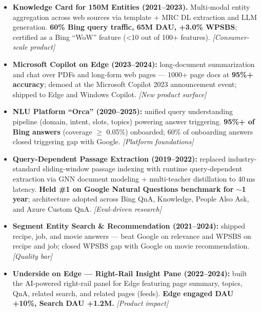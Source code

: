 \documentclass[10.5pt,letterpaper]{article}
\newcommand{\lp}[1]{\textcolor{blue!55!black}{\small\textit{[#1]}}}
\begin{document}
\begin{itemize}
  \item \textbf{Knowledge Card for 150M Entities (2021--2023).} Multi-modal entity aggregation across web sources via template + MRC DL extraction and LLM generation. \textbf{60\% Bing query traffic, 65M DAU, +3.0\% WPSBS}; certified as a Bing ``WoW'' feature (<10 out of 100+ features). \lp{Consumer-scale product}
  \item \textbf{Microsoft Copilot on Edge (2023--2024):} long-document summarization and chat over PDFs and long-form web pages --- 1000+ page docs at \textbf{95\%+ accuracy}; demoed at the Microsoft Copilot 2023 announcement event; shipped to Edge and Windows Copilot. \lp{New product surface}
  \item \textbf{NLU Platform ``Orca'' (2020--2025):} unified query understanding pipeline (domain, intent, slots, topics) powering answer triggering. \textbf{95\%+ of Bing answers} (coverage $\ge$ 0.05\%) onboarded; 60\% of onboarding answers closed triggering gap with Google. \lp{Platform foundations}
  \item \textbf{Query-Dependent Passage Extraction (2019--2022):} replaced industry-standard sliding-window passage indexing with runtime query-dependent extraction via GNN document modeling + multi-teacher distillation to 40\,ms latency. \textbf{Held \#1 on Google Natural Questions benchmark for $\sim$1 year}; architecture adopted across Bing QnA, Knowledge, People Also Ask, and Azure Custom QnA. \lp{Eval-driven research}
  \item \textbf{Segment Entity Search \& Recommendation (2021--2024):} shipped recipe, job, and movie answers --- beat Google on relevance and WPSBS on recipe and job; closed WPSBS gap with Google on movie recommendation. \lp{Quality bar}
  \item \textbf{Underside on Edge --- Right-Rail Insight Pane (2022--2024):} built the AI-powered right-rail panel for Edge featuring page summary, topics, QnA, related search, and related pages (feeds). \textbf{Edge engaged DAU +10\%, Search DAU +1.2M.} \lp{Product impact}
\end{itemize}

\end{document}
